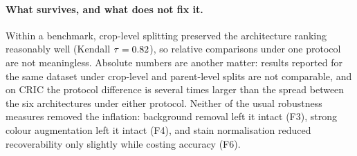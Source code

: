 \paragraph{What survives, and what does not fix it.} Within a benchmark, crop-level splitting
preserved the architecture ranking reasonably well (Kendall $\tau=0.82$), so relative
comparisons under one protocol are not meaningless. Absolute numbers are another matter: results
reported for the same dataset under crop-level and parent-level splits are not comparable, and on
CRIC the protocol difference is several times larger than the spread between the six
architectures under either protocol. Neither of the usual robustness measures removed the
inflation: background removal left it intact (F3), strong colour augmentation left it intact
(F4), and stain normalisation reduced recoverability only slightly while costing accuracy (F6).



